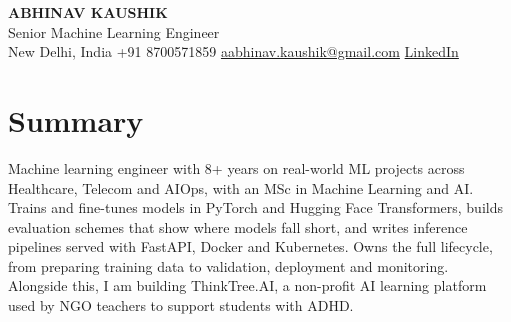 \documentclass[10pt,a4paper]{article}
\begin{document}
\begin{center}
  {\LARGE\bfseries ABHINAV KAUSHIK}\\[2pt]
  {\large Senior Machine Learning Engineer}\\[2pt]
  New Delhi, India \textbar{} +91 8700571859 \textbar{} \href{mailto:aabhinav.kaushik@gmail.com}{aabhinav.kaushik@gmail.com} \textbar{} \href{https://www.linkedin.com/in/abhinav-kaushik10/}{LinkedIn}  
\end{center}

\section{Summary}
Machine learning engineer with 8+ years on real-world ML projects across Healthcare, Telecom and AIOps, with an MSc in Machine Learning and AI. Trains and fine-tunes models in PyTorch and Hugging Face Transformers, builds evaluation schemes that show where models fall short, and writes inference pipelines served with FastAPI, Docker and Kubernetes. Owns the full lifecycle, from preparing training data to validation, deployment and monitoring. Alongside this, I am building ThinkTree.AI, a non-profit AI learning platform used by NGO teachers to support students with ADHD.
\end{document}
